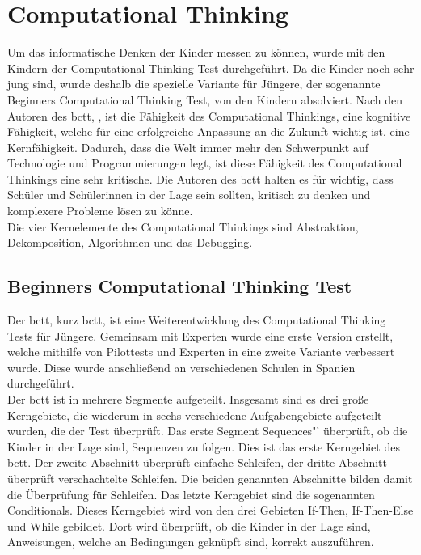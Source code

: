 \section{Computational Thinking} \label{sec:ct}
Um das informatische Denken der Kinder messen zu können, wurde mit den Kindern der Computational Thinking Test durchgeführt. Da die Kinder noch sehr jung sind, wurde deshalb die spezielle Variante für Jüngere, der sogenannte Beginners Computational Thinking Test, von den Kindern absolviert. Nach den Autoren des \acrshort{bctt}, \citeauthor{bcct}, ist die Fähigkeit des Computational Thinkings, eine kognitive Fähigkeit, welche für eine erfolgreiche Anpassung an die Zukunft wichtig ist, eine Kernfähigkeit. Dadurch, dass die Welt immer mehr den Schwerpunkt auf Technologie und Programmierungen legt, ist diese Fähigkeit des Computational Thinkings eine sehr kritische. Die Autoren des \acrshort{bctt} halten es für wichtig, dass Schüler und Schülerinnen in der Lage sein sollten, kritisch zu denken und komplexere Probleme lösen zu könne.\\
Die vier Kernelemente des Computational Thinkings sind Abstraktion, Dekomposition, Algorithmen und das Debugging.\\
\cite{bcct} 
\subsection{Beginners Computational Thinking Test}
Der \acrlong{bctt}, kurz \acrshort{bctt}, ist eine Weiterentwicklung des Computational Thinking Tests für Jüngere. Gemeinsam mit Experten wurde eine erste Version erstellt, welche mithilfe von Pilottests und Experten in eine zweite Variante verbessert wurde. Diese wurde anschließend an verschiedenen Schulen in Spanien durchgeführt.\\

Der \acrshort{bctt} ist in mehrere Segmente aufgeteilt. Insgesamt sind es drei große Kerngebiete, die wiederum in sechs verschiedene Aufgabengebiete aufgeteilt wurden, die der Test überprüft. Das erste Segment \glqq Sequences"' überprüft, ob die Kinder in der Lage sind, Sequenzen zu folgen. Dies ist das erste Kerngebiet des \acrshort{bctt}. Der zweite Abschnitt überprüft einfache Schleifen, der dritte Abschnitt überprüft verschachtelte Schleifen. Die beiden genannten Abschnitte bilden damit die Überprüfung für Schleifen. Das letzte Kerngebiet sind die sogenannten Conditionals. Dieses Kerngebiet wird von den drei Gebieten If-Then, If-Then-Else und While gebildet. Dort wird überprüft, ob die Kinder in der Lage sind, Anweisungen, welche an Bedingungen geknüpft sind, korrekt auszuführen.\\

